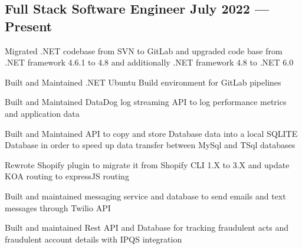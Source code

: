 \documentclass[letter,10pt]{article}
\begin{document}
\subsection{{Full Stack Software Engineer \hfill July 2022 --- Present}}
\begin{zitemize}
\item Migrated .NET codebase from SVN to GitLab and upgraded code base from .NET framework 4.6.1 to 4.8 and additionally .NET framework 4.8 to .NET 6.0
\item Built and Maintained .NET Ubuntu Build environment for GitLab pipelines
\item Built and Maintained DataDog log streaming API to log performance metrics and application data
\item Built and Maintained API to copy and store Database data into a local SQLITE Database in order to speed up data transfer between MySql and TSql databases
\item Rewrote Shopify plugin to migrate it from Shopify CLI 1.X to 3.X and update KOA routing to expressJS routing
\item Built and maintained messaging service and database to send emails and text messages through Twilio API
\item Built and maintained Rest API and Database for tracking fraudulent acts and fraudulent account details with IPQS integration
\end{zitemize}
\end{document}
